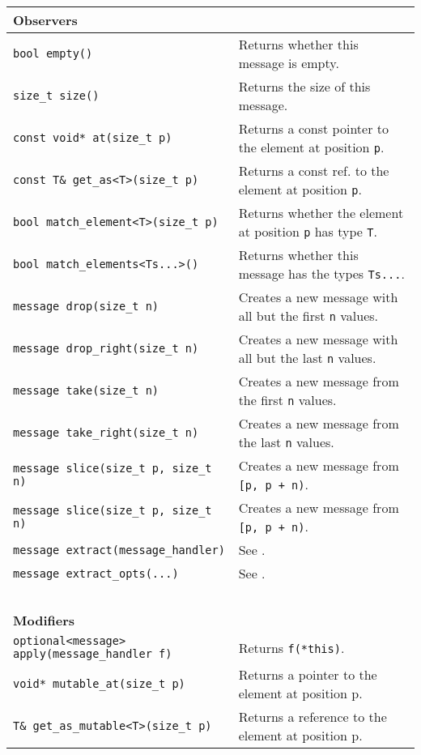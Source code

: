 {\small
\begin{tabular}{ll}
  \textbf{Observers} & ~ \\
  \hline
  \lstinline^bool empty()^ & Returns whether this message is empty. \\
  \hline
  \lstinline^size_t size()^ & Returns the size of this message. \\
  \hline
  \lstinline^const void* at(size_t p)^ & Returns a const pointer to the element at position \lstinline^p^. \\
  \hline
  \lstinline^const T& get_as<T>(size_t p)^ & Returns a const ref. to the element at position \lstinline^p^. \\
  \hline
  \lstinline^bool match_element<T>(size_t p)^ & Returns whether the element at position \lstinline^p^ has type \lstinline^T^. \\
  \hline
  \lstinline^bool match_elements<Ts...>()^ & Returns whether this message has the types \lstinline^Ts...^. \\
  \hline
  \lstinline^message drop(size_t n)^ & Creates a new message with all but the first \lstinline^n^ values. \\
  \hline
  \lstinline^message drop_right(size_t n)^ & Creates a new message with all but the last \lstinline^n^ values. \\
  \hline
  \lstinline^message take(size_t n)^ & Creates a new message from the first \lstinline^n^ values. \\
  \hline
  \lstinline^message take_right(size_t n)^ & Creates a new message from the last \lstinline^n^ values. \\
  \hline
  \lstinline^message slice(size_t p, size_t n)^ & Creates a new message from \lstinline^[p, p + n)^. \\
  \hline
  \lstinline^message slice(size_t p, size_t n)^ & Creates a new message from \lstinline^[p, p + n)^. \\
  \hline
  \lstinline^message extract(message_handler)^ & See . \\
  \hline
  \lstinline^message extract_opts(...)^ & See . \\
  \hline
  ~ & ~ \\ \textbf{Modifiers} & ~ \\
  \hline
  \lstinline^optional<message> apply(message_handler f)^ & Returns \lstinline^f(*this)^. \\
  \hline
  \lstinline^void* mutable_at(size_t p)^ & Returns a pointer to the element at position p. \\
  \hline
  \lstinline^T& get_as_mutable<T>(size_t p)^ & Returns a reference to the element at position p. \\
  \hline
\end{tabular}
}

